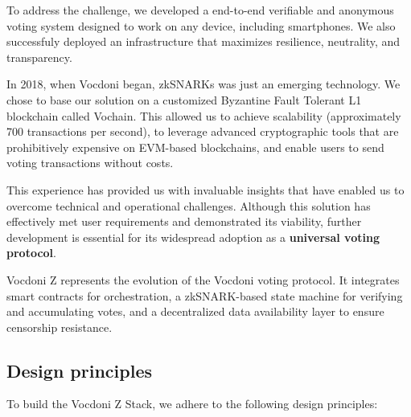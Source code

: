 To address the challenge, we developed a end-to-end verifiable and anonymous voting system designed to work on any device, including smartphones. We also successfuly deployed an infrastructure that maximizes resilience, neutrality, and transparency.

In 2018, when Vocdoni began, zkSNARKs was just an emerging technology. We chose to base our solution on a customized Byzantine Fault Tolerant L1 blockchain called Vochain. This allowed us to achieve scalability (approximately 700 transactions per second), to leverage advanced cryptographic tools that are prohibitively expensive on EVM-based blockchains, and enable users to send voting transactions without costs.

This experience has provided us with invaluable insights that have enabled us to overcome technical and operational challenges. Although this solution has effectively met user requirements and demonstrated its viability, further development is essential for its widespread adoption as a \textbf{universal voting protocol}.

Vocdoni Z represents the evolution of the Vocdoni voting protocol. It integrates smart contracts for orchestration, a zkSNARK-based state machine for verifying and accumulating votes, and a decentralized data availability layer to ensure censorship resistance.

\subsection{Design principles}

To build the Vocdoni Z Stack, we adhere to the following design principles:

